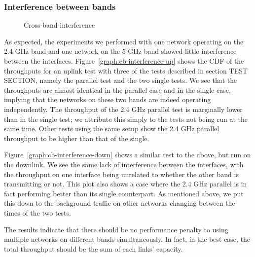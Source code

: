 
\subsubsection{Interference between bands}

\begin{figure}[h]
 \centering
 \subfloat[][Uplink] {\
   \scalebox{0.55}{}\label{graph:cb-interference-up}
 }
 \subfloat[][Downlink] {\
   \scalebox{0.55}{}\label{graph:cb-interference-down}
 }
 \caption{Cross-band interference}\label{graph:cb-interference}
\end{figure}


As expected, the experiments we performed with one network operating on the 2.4
GHz band and one network on the 5 GHz band showed little interference between
the interfaces.  Figure~\ref{graph:cb-interference-up} shows the CDF of the
throughputs for an uplink test with three of the tests described in section TEST
SECTION, namely the parallel test and the two single tests. We see that the    %
throughputs are almost identical in the parallel case and in the single case,
implying that the networks on these two bands are indeed operating
independently. The throughput of the 2.4 GHz parallel test is marginally lower
than in the single test; we attribute this simply to the tests not being run at
the same time. Other tests using the same setup show the 2.4 GHz parallel
throughput to be higher than that of the single.


Figure~\ref{graph:cb-interference-down} shows a similar test to the above, but
run on the downlink. We see the same lack of interference between the
interfaces, with the throughput on one interface being unrelated to whether the
other band is transmitting or not. This plot also shows a case where the 2.4 GHz
parallel is in fact performing better than its single counterpart. As mentioned
above, we put this down to the background traffic on other networks changing
between the times of the two tests.

The results indicate that there should be no performance penalty to using
multiple networks on different bands simultaneously. In fact, in the best case,
the total throughput should be the sum of each links' capacity.

